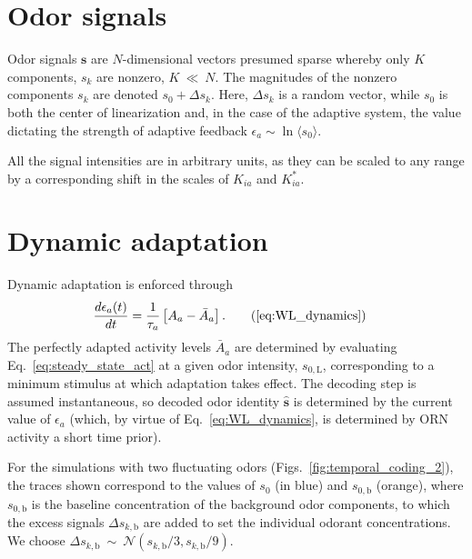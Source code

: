 \documentclass[letterpaper,12pt]{article}
\begin{document}
	
	
	\section*{Odor signals}
	Odor signals $\mathbf s$ are $N$-dimensional vectors presumed sparse whereby only $K$ components, $s_k$ are nonzero,  $K~\ll~N$. The magnitudes of the nonzero components $s_k$ are denoted $s_0 + \Delta s_k$. Here, $\Delta s_k$ is a random vector, while $s_0$ is both the center of linearization and, in the case of the adaptive system, the value dictating the strength of adaptive feedback $\epsilon_a\sim\ln\langle s_0 \rangle$. 
	
	All the signal intensities are in arbitrary units, as they can be scaled to any range by a corresponding shift in the scales of $K_{ia}$ and $K^*_{ia}$.
	
	\section*{Dynamic adaptation}
	
	Dynamic adaptation is enforced through
	\begin{align}
	\frac{d\epsilon_a(t)}{dt} &= \frac{1}{\tau_a}\left[A_a - \bar {A}_{a}\right].
	\tag{\ref{eq:WL_dynamics}}
	\end{align}
	The perfectly adapted activity levels $\bar {A}_{a}$ are determined by evaluating Eq.~\ref{eq:steady_state_act} at a given odor intensity, $s_{0, \text{L}}$, corresponding to a minimum stimulus at which adaptation takes effect. The decoding step is assumed instantaneous, so decoded odor identity $\mathbf {\hat s}$ is determined by the current value of $\epsilon_a$ (which, by virtue of Eq.~\ref{eq:WL_dynamics}, is determined by ORN activity a short time prior).
	
	For the simulations with two fluctuating odors (Figs.~\ref{fig:temporal_coding_2}), the traces shown correspond to the values of $s_0$ (in blue) and $s_{0, \text{b}}$ (orange), where $s_{0, \text{b}}$ is the baseline concentration of the background odor components, to which the excess signals $\Delta s_{k, \text {b}}$ are added to set the individual odorant concentrations. We choose $\Delta s_{k, \text {b}}~\sim~\mathcal N(s_{k, \text {b}}/3, s_{k, \text {b}}/9)$.
	
	
\end{document}

